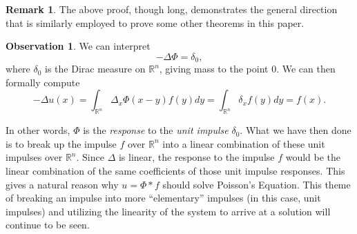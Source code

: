 \documentclass[openany, amssymb, psamsfonts]{amsart}
\theoremstyle{definition}
\newtheorem{rem}{Remark}[section]
\newtheorem{obs}{Observation}[section]
\numberwithin{equation}{section}
\newcommand{\bbr}{\mathbb{R}}
\begin{document}
\begin{rem}
    The above proof, though long, demonstrates the general direction that is similarly employed to prove some other theorems in this paper.
\end{rem}

\begin{obs} \label{obs_response}
    We can interpret \begin{equation} \label{impulse_response}
        - \Delta \Phi = \delta_0,
    \end{equation}
    where $\delta_0$ is the Dirac measure on $\bbr^n$, giving mass to the point 0. We can then formally compute \[
    - \Delta u(x) = \int_{\bbr^n} \Delta_x \Phi(x-y) f(y) dy = \int_{\bbr^n} \delta_x f(y) dy = f(x).
    \]

    In other words, $\Phi$ is the \textit{response} to the \textit{unit impulse} $\delta_0$. What we have then done is to break up the impulse $f$ over $\bbr^n$ into a linear combination of these unit impulses over $\bbr^n$. Since $\Delta$ is linear, the response to the impulse $f$ would be the linear combination of the same coefficients of those unit impulse responses. This gives a natural reason why $u = \Phi * f$ should solve Poisson's Equation. This theme of breaking an impulse into more ``elementary'' impulses (in this case, unit impulses) and utilizing the linearity of the system to arrive at a solution will continue to be seen.
\end{obs}
\end{document}
